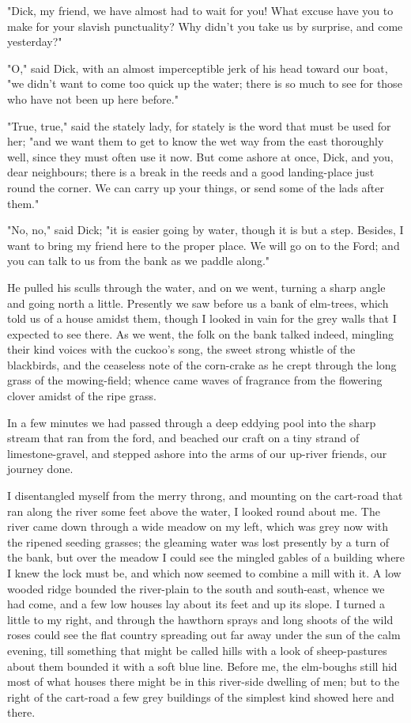 "Dick, my friend, we have almost had to wait for you! What excuse have
you to make for your slavish punctuality? Why didn't you take us by
surprise, and come yesterday?"

"O," said Dick, with an almost imperceptible jerk of his head toward our
boat, "we didn't want to come too quick up the water; there is so much
to see for those who have not been up here before."

"True, true," said the stately lady, for stately is the word that must
be used for her; "and we want them to get to know the wet way from the
east thoroughly well, since they must often use it now. But come ashore
at once, Dick, and you, dear neighbours; there is a break in the reeds
and a good landing-place just round the corner. We can carry up your
things, or send some of the lads after them."

"No, no," said Dick; "it is easier going by water, though it is but a
step. Besides, I want to bring my friend here to the proper place. We
will go on to the Ford; and you can talk to us from the bank as we
paddle along."

He pulled his sculls through the water, and on we went, turning a sharp
angle and going north a little. Presently we saw before us a bank of
elm-trees, which told us of a house amidst them, though I looked in vain
for the grey walls that I expected to see there. As we went, the folk on
the bank talked indeed, mingling their kind voices with the cuckoo's
song, the sweet strong whistle of the blackbirds, and the ceaseless note
of the corn-crake as he crept through the long grass of the
mowing-field; whence came waves of fragrance from the flowering clover
amidst of the ripe grass.

In a few minutes we had passed through a deep eddying pool into the
sharp stream that ran from the ford, and beached our craft on a tiny
strand of limestone-gravel, and stepped ashore into the arms of our
up-river friends, our journey done.

I disentangled myself from the merry throng, and mounting on the
cart-road that ran along the river some feet above the water, I looked
round about me. The river came down through a wide meadow on my left,
which was grey now with the ripened seeding grasses; the gleaming water
was lost presently by a turn of the bank, but over the meadow I could
see the mingled gables of a building where I knew the lock must be, and
which now seemed to combine a mill with it. A low wooded ridge bounded
the river-plain to the south and south-east, whence we had come, and a
few low houses lay about its feet and up its slope. I turned a little to
my right, and through the hawthorn sprays and long shoots of the wild
roses could see the flat country spreading out far away under the sun of
the calm evening, till something that might be called hills with a look
of sheep-pastures about them bounded it with a soft blue line. Before
me, the elm-boughs still hid most of what houses there might be in this
river-side dwelling of men; but to the right of the cart-road a few grey
buildings of the simplest kind showed here and there.

